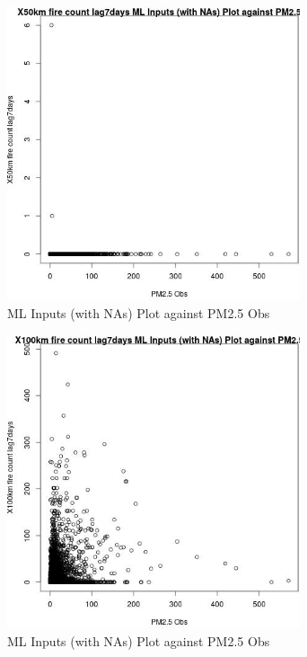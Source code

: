 \begin{figure} 
\centering  
\includegraphics[width=0.77\textwidth]{Code_Outputs/Report_ML_input_PM25_Step4_part_e_de_duplicated_aves_compiled_2019-05-14wNAs_X50km_fire_count_lag7daysvPM25_Obs.jpg} 
\caption{\label{fig:Report_ML_input_PM25_Step4_part_e_de_duplicated_aves_compiled_2019-05-14wNAsX50km_fire_count_lag7daysvPM25_Obs}ML Inputs (with NAs) Plot against PM2.5 Obs} 
\end{figure} 
 

\begin{figure} 
\centering  
\includegraphics[width=0.77\textwidth]{Code_Outputs/Report_ML_input_PM25_Step4_part_e_de_duplicated_aves_compiled_2019-05-14wNAs_X100km_fire_count_lag7daysvPM25_Obs.jpg} 
\caption{\label{fig:Report_ML_input_PM25_Step4_part_e_de_duplicated_aves_compiled_2019-05-14wNAsX100km_fire_count_lag7daysvPM25_Obs}ML Inputs (with NAs) Plot against PM2.5 Obs} 
\end{figure} 
 

